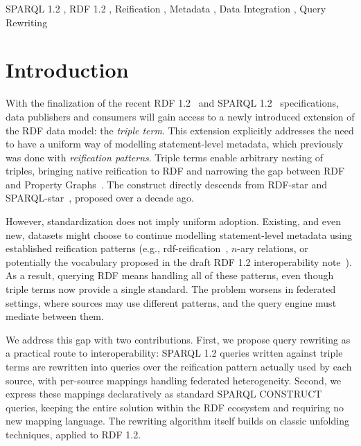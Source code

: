 \documentclass[
]{ceurart}
\begin{document}
\begin{keywords}
  SPARQL 1.2 \sep
  RDF 1.2 \sep
  Reification \sep
  Metadata \sep
  Data Integration \sep
  Query Rewriting
\end{keywords}

\maketitle

\section{Introduction}
\label{sec:introduction}

With the finalization of the recent RDF 1.2~\cite{rdf-1-2} and SPARQL
1.2~\cite{sparql-1-2} specifications, data publishers and consumers
will gain access to a newly introduced extension of the RDF data
model: the \emph{triple term}. This extension explicitly addresses the
need to have a uniform way of modelling statement-level metadata,
which previously was done with \emph{reification patterns}. Triple
terms enable arbitrary nesting of triples, bringing native reification
to RDF and narrowing the gap between RDF and Property
Graphs~\cite{iso-gql}. The construct directly descends from RDF-star
and SPARQL-star~\cite{hartig2017foundations}, proposed over a decade
ago.

However, standardization does not imply uniform adoption. Existing,
and even new, datasets might choose to continue modelling
statement-level metadata using established reification patterns (e.g.,
rdf-reification~\cite{spec:rdf-schema-1-1}, $n$-ary relations, or
potentially the vocabulary proposed in the draft RDF 1.2
interoperability note~\cite{spec:rdf-1-2-interop}). As a result,
querying RDF means handling all of these patterns, even though triple
terms now provide a single standard. The problem worsens in federated
settings, where sources may use different patterns, and the query
engine must mediate between them.

We address this gap with two contributions. First, we propose query
rewriting as a practical route to interoperability: SPARQL 1.2 queries
written against triple terms are rewritten into queries over the
reification pattern actually used by each source, with per-source
mappings handling federated heterogeneity. Second, we express these
mappings declaratively as standard SPARQL CONSTRUCT queries, keeping
the entire solution within the RDF ecosystem and requiring no new
mapping language. The rewriting algorithm itself builds on classic
unfolding techniques, applied to RDF 1.2.
\end{document}
